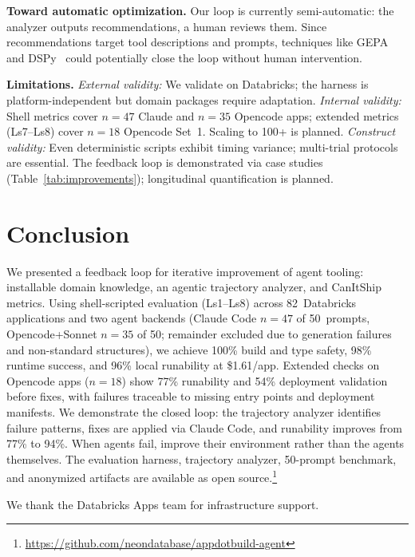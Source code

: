 \documentclass[sigconf,review]{acmart}
\begin{document}
\textbf{Toward automatic optimization.} Our loop is currently semi-automatic: the analyzer outputs recommendations, a human reviews them. Since recommendations target tool descriptions and prompts, techniques like GEPA~\cite{gepa2025} and DSPy~\cite{khattab2023dspy} could potentially close the loop without human intervention.

\textbf{Limitations.} \emph{External validity:} We validate on Databricks; the harness is platform-independent but domain packages require adaptation. \emph{Internal validity:} Shell metrics cover $n{=}47$ Claude and $n{=}35$ Opencode apps; extended metrics (Ls7--Ls8) cover $n{=}18$ Opencode Set~1. Scaling to 100+ is planned. \emph{Construct validity:} Even deterministic scripts exhibit timing variance; multi-trial protocols are essential. The feedback loop is demonstrated via case studies (Table~\ref{tab:improvements}); longitudinal quantification is planned.

\section{Conclusion}
\label{sec:conclusion}

We presented a feedback loop for iterative improvement of agent tooling: installable domain knowledge, an agentic trajectory analyzer, and CanItShip metrics. Using shell-scripted evaluation (Ls1--Ls8) across 82~Databricks applications and two agent backends (Claude Code $n{=}47$ of 50~prompts, Opencode+Sonnet $n{=}35$ of 50; remainder excluded due to generation failures and non-standard structures), we achieve 100\% build and type safety, 98\% runtime success, and 96\% local runability at \$1.61/app. Extended checks on Opencode apps ($n{=}18$) show 77\% runability and 54\% deployment validation before fixes, with failures traceable to missing entry points and deployment manifests. We demonstrate the closed loop: the trajectory analyzer identifies failure patterns, fixes are applied via Claude Code, and runability improves from 77\% to 94\%. When agents fail, improve their environment rather than the agents themselves. The evaluation harness, trajectory analyzer, 50-prompt benchmark, and anonymized artifacts are available as open source.\footnote{\url{https://github.com/neondatabase/appdotbuild-agent}}

\begin{acks}
We thank the Databricks Apps team for infrastructure support.
\end{acks}



\end{document}
